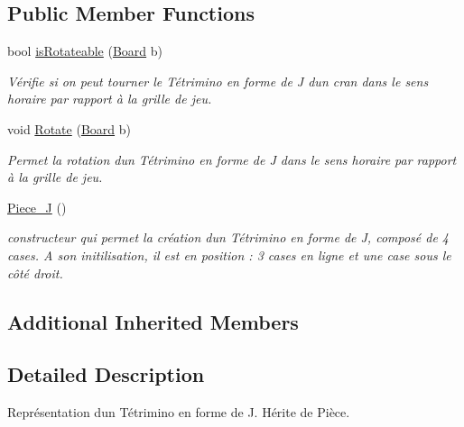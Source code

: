 \subsection*{Public Member Functions}
\begin{DoxyCompactItemize}
\item 
bool \hyperlink{classPiece__J_aee0abd6254be3a50a86ff5464bb459f8}{is\+Rotateable} (\hyperlink{classBoard}{Board} b)
\begin{DoxyCompactList}\small\item\em Vérifie si on peut tourner le Tétrimino en forme de J d\textquotesingle{}un cran dans le sens horaire par rapport à la grille de jeu. \end{DoxyCompactList}\item 
void \hyperlink{classPiece__J_a05b85a353b6d5cefb0055206d4a39014}{Rotate} (\hyperlink{classBoard}{Board} b)
\begin{DoxyCompactList}\small\item\em Permet la rotation d\textquotesingle{}un Tétrimino en forme de J dans le sens horaire par rapport à la grille de jeu. \end{DoxyCompactList}\item 
\mbox{\label{classPiece__J_ac7299340d86be483ba59e3befce76327}} 
\hyperlink{classPiece__J_ac7299340d86be483ba59e3befce76327}{Piece\+\_\+J} ()
\begin{DoxyCompactList}\small\item\em constructeur qui permet la création d\textquotesingle{}un Tétrimino en forme de J, composé de 4 cases. A son initilisation, il est en position \+: 3 cases en ligne et une case sous le côté droit. \end{DoxyCompactList}\end{DoxyCompactItemize}
\subsection*{Additional Inherited Members}


\subsection{Detailed Description}
Représentation d\textquotesingle{}un Tétrimino en forme de J. Hérite de Pièce. 

